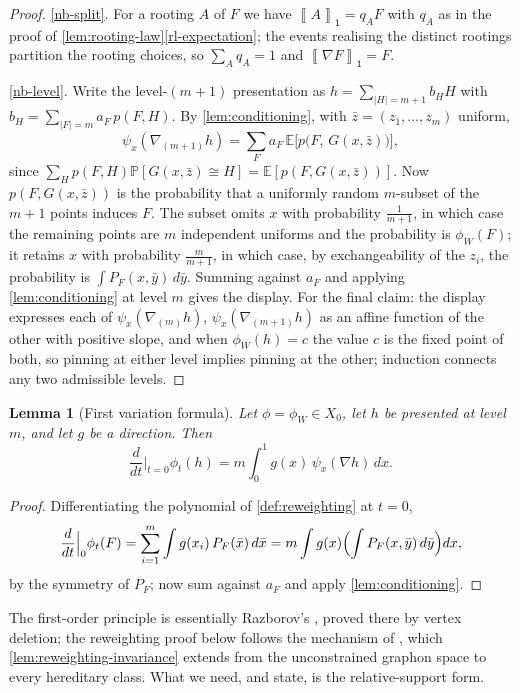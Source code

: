 \documentclass[11pt]{article}
\newtheorem{lemma}[lemma]{Lemma}
\theoremstyle{definition}
\newcommand{\E}{\mathbb{E}}
\newcommand{\Prob}{\mathbb{P}}
\newcommand{\avg}[2]{\left\llbracket #1 \right\rrbracket_{#2}}
\newcommand{\vtype}{\mathsf{1}}
\begin{document}
\begin{proof}
\ref{nb-split}.  For a rooting $A$ of $F$ we have $\avg{A}{\vtype}=q_A F$ with $q_A$
as in the proof of \cref{lem:rooting-law}\ref{rl-expectation}; the events realising the
distinct rootings partition the rooting choices, so $\sum_Aq_A=1$ and
$\avg{\nabla F}{\vtype}=F$.

\ref{nb-level}.  Write the level-$(m+1)$ presentation as
$h=\sum_{|H|=m+1}b_H H$ with $b_H=\sum_{|F|=m}a_F\,p(F,H)$.  By
\cref{lem:conditioning}, with $\bar z=(z_1,\dots,z_m)$ uniform,
\[
  \psi_x(\nabla_{(m+1)}h)
  =\sum_F a_F\,\E\bigl[p\bigl(F,\,G(x,\bar z)\bigr)\bigr],
\]
since $\sum_Hp(F,H)\Prob[G(x,\bar z)\cong H]=\E[p(F,G(x,\bar z))]$.  Now
$p(F,G(x,\bar z))$ is the probability that a uniformly random $m$-subset of the $m+1$
points induces $F$.  The subset omits $x$ with probability $\frac1{m+1}$, in which case
the remaining points are $m$ independent uniforms and the probability is $\phi_W(F)$;
it retains $x$ with probability $\frac m{m+1}$, in which case, by exchangeability of
the $z_i$, the probability is $\int P_F(x,\bar y)\,d\bar y$.  Summing against $a_F$ and
applying \cref{lem:conditioning} at level $m$ gives the display.  For the final
claim: the display expresses each of $\psi_x(\nabla_{(m)}h)$,
$\psi_x(\nabla_{(m+1)}h)$ as an affine function of the other with positive slope, and
when $\phi_W(h)=c$ the value $c$ is the fixed point of both, so pinning at either
level implies pinning at the other; induction connects any two admissible levels.
\end{proof}

\begin{lemma}[First variation formula]\label{lem:first-variation}
Let $\phi=\phi_W\in X_0$, let $h$ be presented at level $m$, and let $g$ be a
direction.  Then
\[
  \frac{d}{dt}\Big|_{t=0}\phi_t(h)
  =m\int_0^1 g(x)\,\psi_x(\nabla h)\,dx .
\]
\end{lemma}

\begin{proof}
Differentiating the polynomial of \cref{def:reweighting} at $t=0$,
\[
  \frac{d}{dt}\Big|_{0}\phi_t(F)
  =\sum_{i=1}^m\int g(x_i)\,P_F(\bar x)\,d\bar x
  =m\int g(x)\Bigl(\int P_F(x,\bar y)\,d\bar y\Bigr)dx,
\]
by the symmetry of $P_F$; now sum against $a_F$ and apply \cref{lem:conditioning}.
\end{proof}

The first-order principle is essentially Razborov's
\cite[Theorem 4.3]{Razborov2007}, proved there by vertex deletion; the reweighting
proof below follows the mechanism of \cite[Lemma 16.5]{Lovasz2012book}, which
\cref{lem:reweighting-invariance} extends from the unconstrained graphon space to every
hereditary class.  What we need, and state, is the relative-support form.
\end{document}
